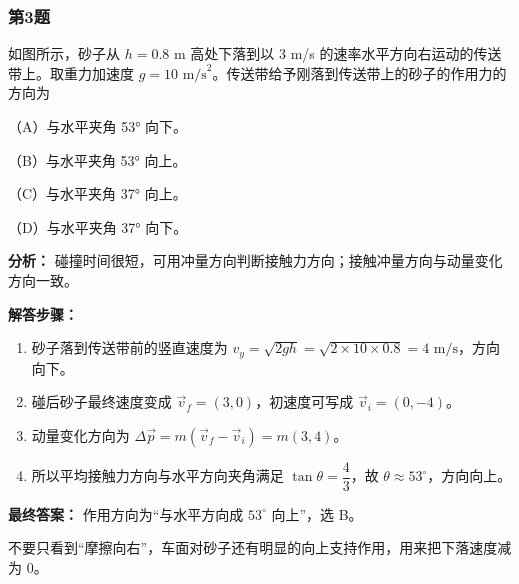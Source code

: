 \documentclass[12pt,a4paper]{ctexart}
\begin{document}
\subsubsection*{第3题}
\begin{tcolorbox}[colback=gray!2!white,colframe=black!60,title={题目}]
如图所示，砂子从 \(h=0.8\text{ m}\) 高处下落到以 3 m/s 的速率水平方向右运动的传送带上。取重力加速度 \(g=10\text{ m/s}^2\)。传送带给予刚落到传送带上的砂子的作用力的方向为\par
（A）与水平夹角 53° 向下。\par
（B）与水平夹角 53° 向上。\par
（C）与水平夹角 37° 向上。\par
（D）与水平夹角 37° 向下。\par
\end{tcolorbox}
\begin{tcolorbox}[colback=blue!2!white,colframe=blue!55!black,title={完整答案}]
\textbf{分析：}
碰撞时间很短，可用冲量方向判断接触力方向；接触冲量方向与动量变化方向一致。\par
\textbf{解答步骤：}
\begin{enumerate}
\item 砂子落到传送带前的竖直速度为 \(v_y=\sqrt{2gh}=\sqrt{2\times 10\times 0.8}=4\text{ m/s}\)，方向向下。
\item 碰后砂子最终速度变成 \(\vec v_f=(3,0)\)，初速度可写成 \(\vec v_i=(0,-4)\)。
\item 动量变化方向为 \(\Delta \vec p=m(\vec v_f-\vec v_i)=m(3,4)\)。
\item 所以平均接触力方向与水平方向夹角满足 \(\tan\theta=\dfrac{4}{3}\)，故 \(\theta\approx 53^\circ\)，方向向上。
\end{enumerate}
\textbf{最终答案：}
作用方向为“与水平方向成 \(53^\circ\) 向上”，选 B。\par
\end{tcolorbox}
\begin{tcolorbox}[colback=red!2!white,colframe=red!55!black,title={易错点}]
不要只看到“摩擦向右”，车面对砂子还有明显的向上支持作用，用来把下落速度减为 0。\par
\end{tcolorbox}
\end{document}
